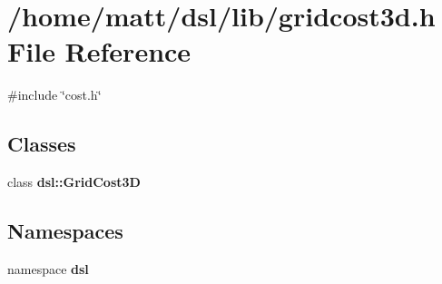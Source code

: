 \section{/home/matt/dsl/lib/gridcost3d.h \-File \-Reference}
\label{gridcost3d_8h}
{\ttfamily \#include \char`\"{}cost.\-h\char`\"{}}\*
\subsection*{\-Classes}
\begin{DoxyCompactItemize}
\item 
class {\bf dsl\-::\-Grid\-Cost3\-D}
\end{DoxyCompactItemize}
\subsection*{\-Namespaces}
\begin{DoxyCompactItemize}
\item 
namespace {\bf dsl}
\end{DoxyCompactItemize}
